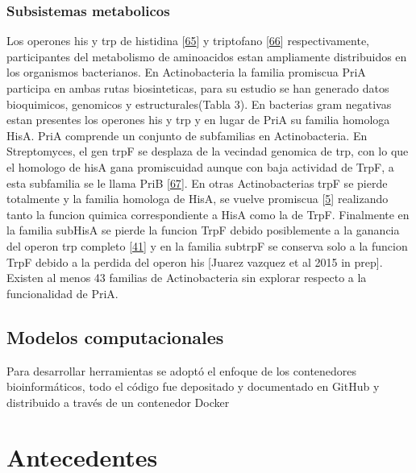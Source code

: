 \documentclass[12pt,twoside]{reedthesis}
\begin{document}
  \subsection{Subsistemas metabolicos}\label{subsistemas-metabolicos}
  
  Los operones his y trp de histidina
  {[}\protect\hyperlink{ref-fondi_evolution_2009}{65}{]} y triptofano
  {[}\protect\hyperlink{ref-merino_evolution_2008}{66}{]} respectivamente,
  participantes del metabolismo de aminoacidos estan ampliamente
  distribuidos en los organismos bacterianos. En Actinobacteria la familia
  promiscua PriA participa en ambas rutas biosinteticas, para su estudio
  se han generado datos bioquimicos, genomicos y estructurales(Tabla 3).
  En bacterias gram negativas estan presentes los operones his y trp y en
  lugar de PriA su familia homologa HisA. PriA comprende un conjunto de
  subfamilias en Actinobacteria. En Streptomyces, el gen trpF se desplaza
  de la vecindad genomica de trp, con lo que el homologo de hisA gana
  promiscuidad aunque con baja actividad de TrpF, a esta subfamilia se le
  llama PriB
  {[}\protect\hyperlink{ref-verduzco-castro_co-occurrence_2016}{67}{]}. En
  otras Actinobacterias trpF se pierde totalmente y la familia homologa de
  HisA, se vuelve promiscua
  {[}\protect\hyperlink{ref-baronagomez_occurrence_2003}{5}{]} realizando
  tanto la funcion quimica correspondiente a HisA como la de TrpF.
  Finalmente en la familia subHisA se pierde la funcion TrpF debido
  posiblemente a la ganancia del operon trp completo
  {[}\protect\hyperlink{ref-noda-garcia_evolution_2013}{41}{]} y en la
  familia subtrpF se conserva solo a la funcion TrpF debido a la perdida
  del operon his {[}Juarez vazquez et al 2015 in prep{]}. Existen al menos
  43 familias de Actinobacteria sin explorar respecto a la funcionalidad
  de PriA.
  
  \section{Modelos computacionales}\label{modelos-computacionales}
  
  Para desarrollar herramientas se adoptó el enfoque de los contenedores
  bioinformáticos, todo el código fue depositado y documentado en GitHub y
  distribuido a través de un contenedor Docker
  
  \clearpage  
  
  \chapter*{Antecedentes}\label{antecedentes}
  
\end{document}
